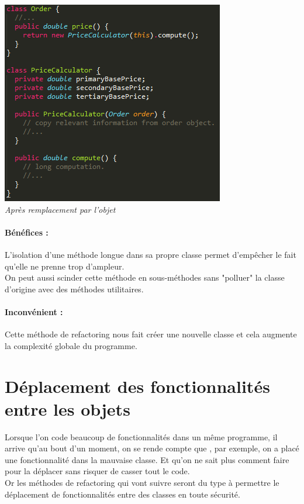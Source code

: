 \documentclass[a4paper,twoside,12pt,openright]{report}
\begin{document}
\begin{center}
\includegraphics[scale=1]{Image/MethodeToObjet2.png}\\
\itshape{Après remplacement par l'objet \cite{ref5}}
\end{center}

\paragraph{Bénéfices :}
L'isolation d'une méthode longue dans sa propre classe permet d'empêcher le fait qu'elle ne prenne trop d'ampleur.\\
On peut aussi scinder cette méthode en sous-méthodes sans "polluer" la classe d'origine avec des méthodes utilitaires.

\paragraph{Inconvénient :}
Cette méthode de refactoring nous fait créer une nouvelle classe et cela augmente la complexité globale du programme.\\

\newpage

\section{Déplacement des fonctionnalités entre les objets}
Lorsque l'on code beaucoup de fonctionnalités dans un même programme, il arrive qu'au bout d'un moment, on se rende compte que , par exemple, on a placé une fonctionnalité dans la mauvaise classe. Et qu'on ne sait plus comment faire pour la déplacer sans risquer de casser tout le code.\\
Or les méthodes de refactoring qui vont suivre seront du type à permettre le déplacement de fonctionnalités entre des classes en toute sécurité.\\
\end{document}
